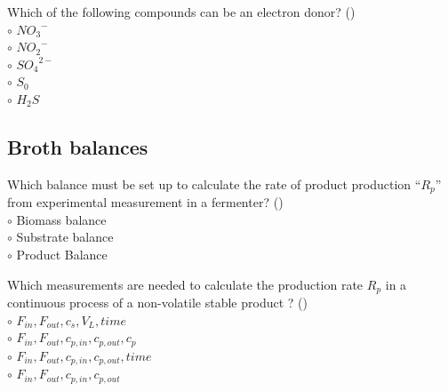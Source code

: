 \documentclass[]{beamer}
\begin{document}
\begin{frame}[shrink] {}
\addtocounter{questions}{1}
\color{blue}
Which of the following compounds can be an electron donor?   ()\\
\color{black}
\setlength{\parindent}{-0.4cm}
{\color{red}$\circ$}  ${NO_{3}}^{-}$\\
{\color{red}$\circ$} ${NO_{2}}^{-}$\\
{\color{red}$\circ$} ${SO_{4}}^{2-}$\\
{\color{red}$\circ$} $S_0$\\
{\color{red}$\circ$} $H_{2}S$ \\
\end{frame}

\subsection{Broth balances}
\setcounter{questions}{0}

\begin{frame}[shrink] {}
\addtocounter{questions}{1}
\color{blue}
Which balance must be set up to calculate the rate of product production “$R_p$” from experimental measurement in a fermenter? ()\\
\color{black}
\setlength{\parindent}{-0.4cm}
{\color{red}$\circ$} Biomass balance\\
{\color{red}$\circ$} Substrate balance\\
{\color{red}$\circ$} Product Balance \\
\end{frame}

\begin{frame}[shrink] {}
\addtocounter{questions}{1}
\color{blue}
Which measurements are needed to calculate the production rate $R_p$ in a continuous process of a non-volatile stable product ? ()\\
\color{black}
\setlength{\parindent}{-0.4cm}
{\color{red}$\circ$}  $F_{in},F_{out},c_{s},V_{L},time$  \\
{\color{red}$\circ$}  $F_{in},F_{out},c_{p,in},c_{p,out},c_p$ \\
{\color{red}$\circ$}  $F_{in},F_{out},c_{p,in},c_{p,out},time$ \\
{\color{red}$\circ$}  $F_{in},F_{out},c_{p,in},c_{p,out}$\\
\end{frame}
\end{document}
